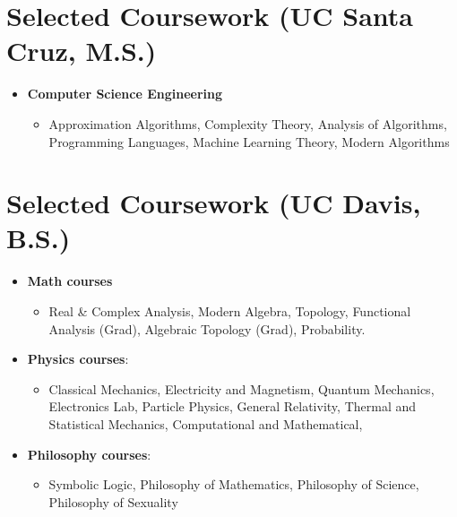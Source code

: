 \documentclass{curriculum-vitae}
\begin{document}
\section{Selected Coursework (UC Santa Cruz, M.S.)}
\begin{itemize}
    \item\textbf{Computer Science Engineering}
    \begin{itemize}
        \item Approximation Algorithms, Complexity Theory, Analysis of Algorithms, Programming Languages, Machine Learning Theory, Modern Algorithms
    \end{itemize}


\end{itemize}

\section{Selected Coursework (UC Davis, B.S.)}
\begin{itemize}
    \item\textbf{Math courses}
    \begin{itemize}
        \item Real \& Complex Analysis, Modern Algebra, Topology, Functional Analysis (Grad), Algebraic Topology (Grad), Probability.
    \end{itemize}


    \item\textbf{Physics courses}:
    \begin{itemize}
        \item Classical Mechanics,
        Electricity and Magnetism,
        Quantum Mechanics,
        Electronics Lab,
        Particle Physics,
        General Relativity,
        Thermal and Statistical Mechanics,
        Computational and Mathematical,

    \end{itemize}

    \item\textbf{Philosophy courses}:
    \begin{itemize}
        \item Symbolic Logic,
        Philosophy of Mathematics, 
        Philosophy of Science,
        Philosophy of Sexuality
    \end{itemize}
\end{itemize}
\end{document}
